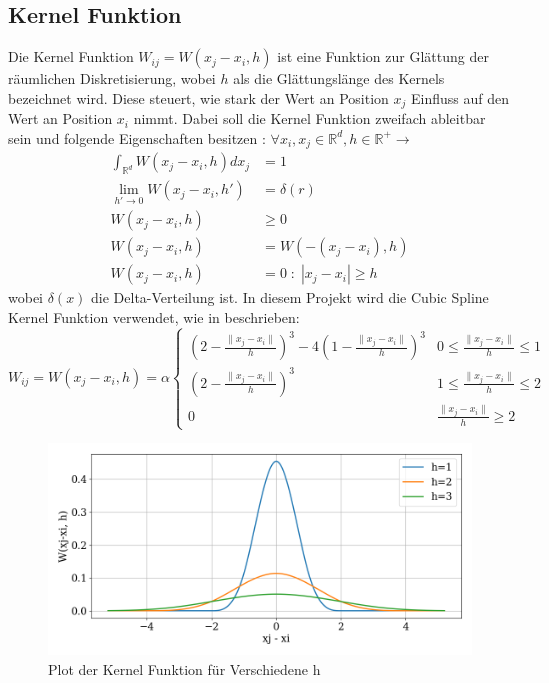 \documentclass[a4paper, 12pt]{article}
\begin{document}
\subsection{Kernel Funktion}
Die Kernel Funktion \(W_{ij} = W(x_j - x_i, h)\) ist eine Funktion zur Glättung der räumlichen Diskretisierung, wobei \(h\) als die Glättungslänge des Kernels bezeichnet wird. Diese steuert, wie stark der Wert an Position \(x_j\) Einfluss auf den Wert an Position \(x_i\) nimmt. Dabei soll die Kernel Funktion zweifach ableitbar sein und folgende Eigenschaften besitzen \cite{10.1111:cgf.14508}: \(\forall x_i, x_j \in \mathds{R}^d, h\in \mathds{R}^+ \rightarrow\)
\begin{align}
	\int_{\mathds{R}^d} W(x_j - x_i, h) dx_j &= 1 \label{kernelEigenschaft1}\\
	\lim_{h'\rightarrow 0} W(x_j - x_i, h') &= \delta(r) \label{kernelEigenschaft2}\\
	W(x_j - x_i, h) &\geq 0 \label{kernelEigenschaft3}\\
	W(x_j - x_i, h) &= W(-(x_j - x_i), h) \label{kernelEigenschaft4}\\
	W(x_j - x_i, h) &= 0\;:\; |x_j - x_i| \geq h \label{kernelEigenschaft5}
\end{align}
wobei \(\delta(x)\) die Delta-Verteilung ist. 
In diesem Projekt wird die Cubic Spline Kernel Funktion verwendet, wie in \cite{professor_presentation_2024} beschrieben:
\begin{equation*}
	W_{ij} = W(x_j - x_i, h) = \alpha \begin{cases} 
	(2-\frac{\|x_j - x_i\|}{h})^3 - 4(1-\frac{\|x_j - x_i\|}{h})^3 & 0 \leq \frac{\|x_j - x_i\|}{h} \leq 1\\
	(2-\frac{\|x_j - x_i\|}{h})^3 & 1 \leq \frac{\|x_j - x_i\|}{h} \leq 2 \\
	0 & \frac{\|x_j - x_i\|}{h} \geq 2 
	\end{cases}
\end{equation*}

\begin{figure}[H]
	\centering
	\includegraphics[width=.85\textwidth]{graphics/KernelPlot.png}
	\caption{Plot der Kernel Funktion für Verschiedene h}
\end{figure}
\end{document}
